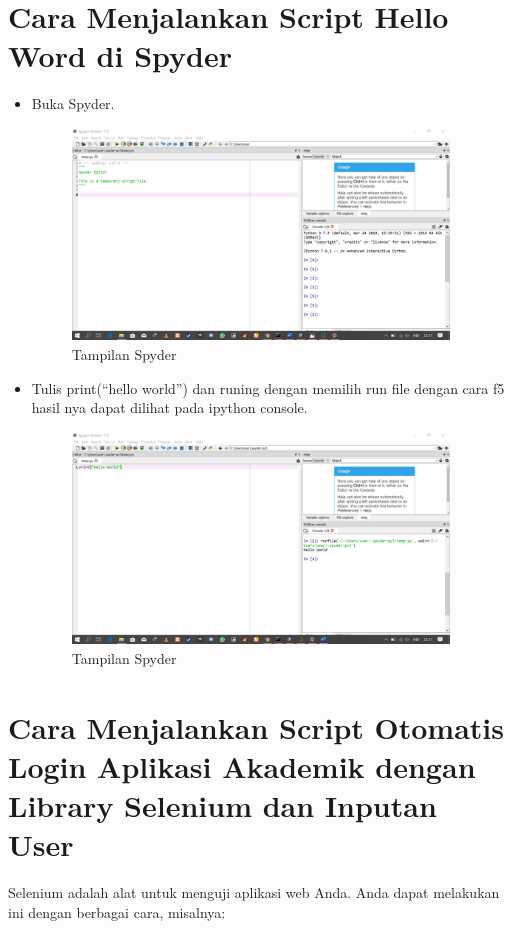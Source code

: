 \documentclass{article}
\begin{document}
\section{Cara Menjalankan Script Hello Word di Spyder}
\begin{itemize}
\item Buka Spyder.
\begin{figure}[!htbp]
	\centering
	\includegraphics[width=10cm]{figures/conda6.png}
	\caption{Tampilan Spyder}
\end{figure}
\item Tulis print(“hello world”) dan runing dengan memilih run file dengan cara f5 hasil nya dapat dilihat pada ipython console.
\begin{figure}[!htbp]
	\centering
	\includegraphics[width=10cm]{figures/conda7.png}
	\caption{Tampilan Spyder}
\end{figure}
\end{itemize}

\section {Cara Menjalankan Script Otomatis Login Aplikasi Akademik dengan Library Selenium dan Inputan User}
Selenium adalah alat untuk menguji aplikasi web Anda. Anda dapat melakukan ini dengan berbagai cara, misalnya:
\end{document}
